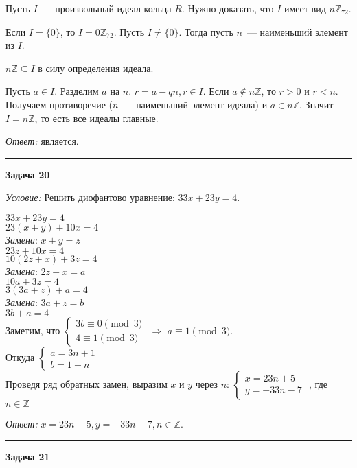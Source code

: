 \documentclass[12pt,a4paper]{article}
\newcommand{\sbs}{\large \bfseries}
\newcommand{\rl}{\vspace{16pt} \hrule \vspace{8pt}}
\begin{document}
Пусть $I$~--- произвольный идеал кольца $R$. Нужно доказать, что $I$ имеет вид $n\mathds{Z}_{72}$.

Если $I = \{0\}$, то $I  = 0\mathds{Z}_{72}$.
Пусть $I \neq \{0\}$. Тогда пусть $n$~--- наименьший элемент из $I$.

$n \mathds{Z} \subseteq I$ в силу определения идеала.\null

Пусть $a \in I$. Разделим $a$ на $n$. $r = a - qn,  r \in I$. Если $a \notin n \mathds{Z}$, то $r>0$ и $r<n$. Получаем противоречие ($n$~--- наименьший элемент идеала) и $a \in  n\mathds{Z}$. Значит $I = n\mathds{Z}$, то есть все идеалы главные.

{\itshape Ответ: } является.




\rl
{\sbs Задача 20}

{\itshape Условие: } Решить диофантово уравнение: $33x+23y=4$.

$33x+23y=4$
\\$23(x+y)+10x=4$
\\\textit{Замена}: $x+y=z$
\\$23z+10x=4$
\\$10(2z+x)+3z=4$
\\\textit{Замена}: $2z+x=a$
\\$10a+3z=4$
\\$3(3a+z)+a=4$
\\\textit{Замена}: $3a+z=b$
\\$3b+a=4$
\\Заметим, что
$
\left\{
\begin{array}{l}
3b\equiv 0 \pmod{3}\\
4\equiv 1 \pmod {3}
\end{array}
\right.
$
$\Longrightarrow $ $a\equiv 1 \pmod {3}$.
\\Откуда
$
\left\{
\begin{array}{l}
a=3n+1\\
b=1-n
\end{array}
\right.
$
\null
\\Проведя ряд обратных замен, выразим $x$ и $y$ через $n$:
$
\left\{
\begin{array}{l}
x = 23 n + 5\\
y = - 33 n - 7
\end{array}
\right.
$
, где $n\in \mathds{Z}$

{\itshape Ответ: } $x=23n-5, y=-33n-7, n\in \mathds Z$.




\rl
{\sbs Задача 21}
\end{document}
